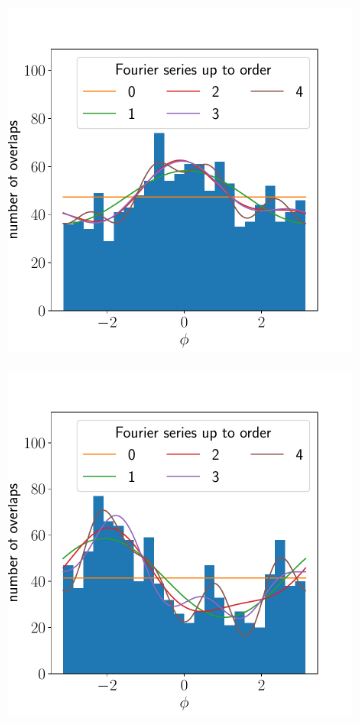 \documentclass{article}
\begin{document}
\begin{figure}[ht]
\begin{subfigure}{0.24\linewidth}
		\caption{}
		\label{fig:isotropyhistvectra3all}
	\end{subfigure}
	\begin{subfigure}{0.24\linewidth}
		\includegraphics[width=\linewidth]{isotropy-histogram-JHUVectra-2-all}
		\caption{}
		\label{fig:isotropyhistvectra2all}
	\end{subfigure}
	\begin{subfigure}{0.24\linewidth}
		\includegraphics[width=\linewidth]{isotropy-histogram-JHUVectra-1-all}

\end{subfigure}
\end{figure}
\end{document}

